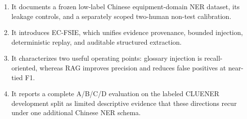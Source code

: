 \begin{enumerate}
  \item It documents a frozen low-label Chinese equipment-domain NER dataset,
  its leakage controls, and a separately scoped two-human non-test calibration.
  \item It introduces EC-FSIE, which unifies evidence provenance, bounded
  injection, deterministic replay, and auditable structured extraction.
  \item It characterizes two useful operating points: glossary injection is
  recall-oriented, whereas RAG improves precision and reduces false positives
  at near-tied F1.
  \item It reports a complete A/B/C/D evaluation on the labeled CLUENER
  development split as limited descriptive evidence that these directions
  recur under one additional Chinese NER schema.
\end{enumerate}
